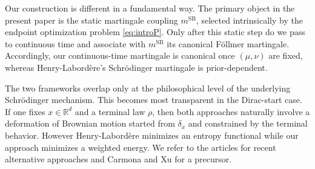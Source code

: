 \documentclass[reqno, a4paper]{amsart}
\newcommand{\msb}{m^{\text{SB}}}
\theoremstyle{plain}
\theoremstyle{definition}
\theoremstyle{remark}
\numberwithin{equation}{section}
\numberwithin{theorem}{section}
\newcommand{\R}{\mathbb{R}}
\begin{document}
	Our construction is different in a fundamental way.
	The primary object in the present paper is the static martingale coupling \(\msb\), selected intrinsically by the endpoint optimization problem \eqref{eq:introP}.
	Only after this static step do we pass to continuous time and associate with \(\msb\) its canonical F\"ollmer martingale.
	Accordingly, our continuous-time martingale is canonical once \((\mu,\nu)\) are fixed, whereas Henry-Labord\`ere's Schr\"odinger martingale is prior-dependent.
	
	
	The two frameworks overlap only at the philosophical  level of the underlying Schr\"odinger  mechanism.
	This becomes most transparent in the Dirac-start case.
	If one fixes \(x\in\R^d\) and a terminal law \(\rho\), then  both approaches naturally involve a deformation of Brownian motion started from \(\delta_x\) and constrained by the terminal behavior. However Henry-Labord\`ere minimizes an entropy functional while our approach minimizes a weighted energy. We refer to the articles \cite{AlHLLoMaPhTo26a,AlHLLoMaPhTo26b,DMPhZa26} for recent alternative approaches and Carmona and Xu \cite{CaXu97} for a precursor.
\end{document}
